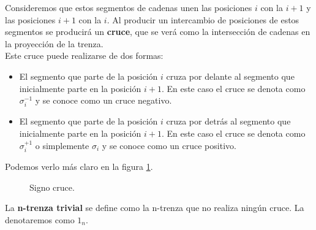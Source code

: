 Consideremos que estos segmentos de cadenas unen las posiciones $i$ con la $i+1$ y las posiciones $i+1$ con la $i$. Al producir un intercambio de posiciones de estos segmentos se producirá un \textbf{cruce}, que se verá como la intersección de cadenas en la proyección de la trenza.\\
Este cruce puede realizarse de dos formas: 
\begin{itemize}
	\item El segmento que parte de la posición $i$ cruza por delante al segmento que inicialmente parte en la posición $i+1$. En este caso el cruce se denota como $\sigma_{i}^{-1}$ y se conoce como un cruce negativo.
	\item  El segmento que parte de la posición $i$ cruza por detrás al segmento que inicialmente parte en la posición $i+1$. En este caso el cruce se denota como $\sigma_{i}^{+1}$ o simplemente $\sigma_{i}$ y se conoce como un cruce positivo.
\end{itemize}
Podemos verlo más claro en la figura \ref{tren4}.\\
\begin{figure}[h!]
	\centering
	\space
	\caption{Signo cruce.}
	\label{tren4} 
\end{figure}

La \textbf{n-trenza trivial} se define como la n-trenza que no realiza ningún cruce. La denotaremos como $1_{n}.$ \\

